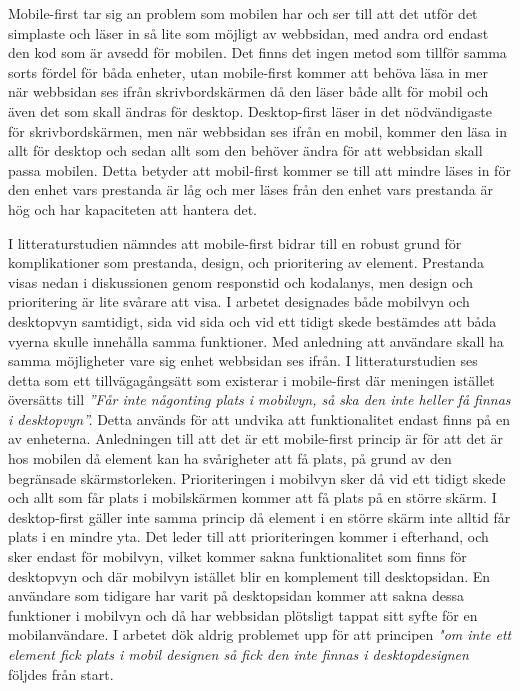 \documentclass[11pt]{article}
\begin{document}
Mobile-first tar sig an problem som mobilen har och ser till att det utför det simplaste och läser in så lite som möjligt av webbsidan, med andra ord endast den kod som är avsedd för mobilen. Det finns det ingen metod som tillför samma sorts fördel för båda enheter, utan mobile-first kommer att behöva läsa in mer när webbsidan ses ifrån skrivbordskärmen då den läser både allt för mobil och även det som skall ändras för desktop. Desktop-first läser in det nödvändigaste för skrivbordskärmen, men när webbsidan ses ifrån en mobil, kommer den läsa in allt för desktop och sedan allt som den behöver ändra för att webbsidan skall passa mobilen. Detta betyder att mobil-first kommer se till att mindre läses in för den enhet vars prestanda är låg och mer läses från den enhet vars prestanda är hög och har kapaciteten att hantera det.

I litteraturstudien nämndes att mobile-first bidrar till en robust grund för komplikationer som prestanda, design, och prioritering av element. Prestanda visas nedan i diskussionen genom responstid och kodalanys, men design och prioritering är lite svårare att visa. I arbetet designades både mobilvyn och desktopvyn samtidigt, sida vid sida och vid ett tidigt skede bestämdes att båda vyerna skulle innehålla samma funktioner. Med anledning att användare skall ha samma möjligheter vare sig enhet webbsidan ses ifrån. I litteraturstudien ses detta som ett tillvägagångsätt som existerar i mobile-first där meningen istället översätts till \textit{”Får inte någonting plats i mobilvyn, så ska den inte heller få finnas i desktopvyn”.} Detta används för att undvika att funktionalitet endast finns på en av enheterna. Anledningen till att det är ett mobile-first princip är för att det är hos mobilen då element kan ha svårigheter att få plats, på grund av den begränsade skärmstorleken. Prioriteringen i mobilvyn sker då vid ett tidigt skede och allt som får plats i mobilskärmen kommer att få plats på en större skärm. I desktop-first gäller inte samma princip då element i en större skärm inte alltid får plats i en mindre yta. Det leder till att prioriteringen kommer i efterhand, och sker endast för mobilvyn, vilket kommer sakna funktionalitet som finns för desktopvyn och där mobilvyn istället blir en komplement till desktopsidan. En användare som tidigare har varit på desktopsidan kommer att sakna dessa funktioner i mobilvyn och då har webbsidan plötsligt tappat sitt syfte för en mobilanvändare. 
I arbetet dök aldrig problemet upp för att principen \textit{"om inte ett element fick plats i mobil designen så fick den inte finnas i desktopdesignen} följdes från start.
\end{document}

